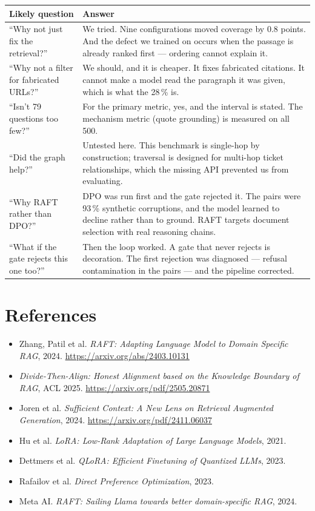 \documentclass[11pt,a4paper]{article}
\begin{document}
\begin{table}[h]\centering\small
\begin{tabularx}{\textwidth}{Y Y}
\toprule
\textbf{Likely question} & \textbf{Answer} \\
\midrule
``Why not just fix the retrieval?'' & We tried. Nine configurations moved coverage
by 0.8 points. And the defect we trained on occurs when the passage is already
ranked first --- ordering cannot explain it. \\
 ``Why not a filter for fabricated URLs?'' & We should, and it is
cheaper. It fixes fabricated citations. It cannot make a model read the paragraph
it was given, which is what the 28\,\% is. \\
``Isn't 79 questions too few?'' & For the primary metric, yes, and the interval is
stated. The mechanism metric (quote grounding) is measured on all 500. \\
 ``Did the graph help?'' & Untested here. This benchmark is
single-hop by construction; traversal is designed for multi-hop ticket
relationships, which the missing API prevented us from evaluating. \\
``Why RAFT rather than DPO?'' & DPO was run first and the gate rejected it. The
pairs were 93\,\% synthetic corruptions, and the model learned to decline rather
than to ground. RAFT targets document selection with real reasoning chains. \\
 ``What if the gate rejects this one too?'' & Then the loop worked.
A gate that never rejects is decoration. The first rejection was diagnosed --- refusal
contamination in the pairs --- and the pipeline corrected. \\
\bottomrule
\end{tabularx}
\end{table}

\section*{References}
\small
\begin{itemize}[leftmargin=1.2em,itemsep=1pt]
  \item Zhang, Patil et al. \textit{RAFT: Adapting Language Model to Domain Specific RAG}, 2024. \url{https://arxiv.org/abs/2403.10131}
  \item \textit{Divide-Then-Align: Honest Alignment based on the Knowledge Boundary of RAG}, ACL 2025. \url{https://arxiv.org/pdf/2505.20871}
  \item Joren et al. \textit{Sufficient Context: A New Lens on Retrieval Augmented Generation}, 2024. \url{https://arxiv.org/pdf/2411.06037}
  \item Hu et al. \textit{LoRA: Low-Rank Adaptation of Large Language Models}, 2021.
  \item Dettmers et al. \textit{QLoRA: Efficient Finetuning of Quantized LLMs}, 2023.
  \item Rafailov et al. \textit{Direct Preference Optimization}, 2023.
  \item Meta AI. \textit{RAFT: Sailing Llama towards better domain-specific RAG}, 2024.
\end{itemize}
\end{document}
